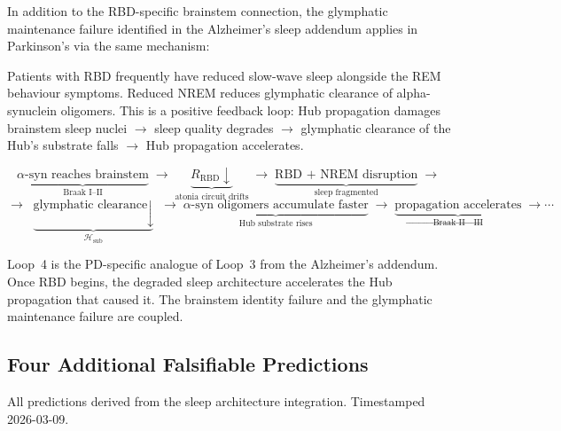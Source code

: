 \documentclass[12pt,a4paper]{article}
\begin{document}
In addition to the RBD-specific brainstem connection, the glymphatic
maintenance failure identified in the Alzheimer's sleep addendum applies
in Parkinson's via the same mechanism:

\begin{description}[leftmargin=2em, itemsep=0.5em]
  \item[\textbf{RBD disrupts NREM architecture:}] Patients with RBD
    frequently have reduced slow-wave sleep alongside the REM behaviour
    symptoms. Reduced NREM reduces glymphatic clearance of alpha-synuclein
    oligomers. This is a positive feedback loop: Hub propagation damages
    brainstem sleep nuclei $\to$ sleep quality degrades $\to$ glymphatic
    clearance of the Hub's substrate falls $\to$ Hub propagation accelerates.

  \item[\textbf{Loop~4 (PD-specific):}]
    \[
    \underbrace{\alpha\text{-syn reaches brainstem}}_{\text{Braak~I--II}}
    \;\longrightarrow\;
    \underbrace{R_{\mathrm{RBD}} \downarrow}_{\text{atonia circuit drifts}}
    \;\longrightarrow\;
    \underbrace{\text{RBD + NREM disruption}}_{\text{sleep fragmented}}
    \;\longrightarrow\;
    \]
    \[
    \longrightarrow\;
    \underbrace{\text{glymphatic clearance} \downarrow}_{\mathcal{H}_{\mathrm{sub}}}
    \;\longrightarrow\;
    \underbrace{\alpha\text{-syn oligomers accumulate faster}}_{\text{Hub substrate rises}}
    \;\longrightarrow\;
    \underbrace{\text{propagation accelerates}}_{\text{Braak~II} \to \text{III}}
    \;\longrightarrow \cdots
    \]

    Loop~4 is the PD-specific analogue of Loop~3 from the Alzheimer's
    addendum. Once RBD begins, the degraded sleep architecture accelerates
    the Hub propagation that caused it. The brainstem identity failure
    and the glymphatic maintenance failure are coupled.
\end{description}

\subsection{Four Additional Falsifiable Predictions}

All predictions derived from the sleep architecture integration.
Timestamped 2026-03-09.
\end{document}
